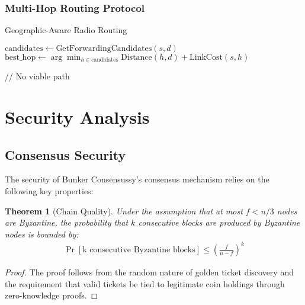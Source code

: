 \documentclass[11pt,a4paper]{article}
\newtheorem{theorem}{Theorem}[section]
\begin{document}
\subsubsection{Multi-Hop Routing Protocol}

\begin{algorithm}[H]
\SetAlgoLined
{}
\caption{Geographic-Aware Radio Routing}



$\text{candidates} \leftarrow \text{GetForwardingCandidates}(s, d)$\;
$\text{best\_hop} \leftarrow \arg\min_{h \in \text{candidates}} \text{Distance}(h, d) + \text{LinkCost}(s, h)$\;


\; // No viable path
\end{algorithm}

\section{Security Analysis}

\subsection{Consensus Security}

The security of Bunker Consensussy's consensus mechanism relies on the following key properties:

\begin{theorem}[Chain Quality]
Under the assumption that at most $f < n/3$ nodes are Byzantine, the probability that $k$ consecutive blocks are produced by Byzantine nodes is bounded by:
\begin{align}
\Pr[\text{k consecutive Byzantine blocks}] \leq \left(\frac{f}{n-f}\right)^k
\end{align}
\end{theorem}

\begin{proof}
The proof follows from the random nature of golden ticket discovery and the requirement that valid tickets be tied to legitimate coin holdings through zero-knowledge proofs.
\end{proof}
\end{document}
